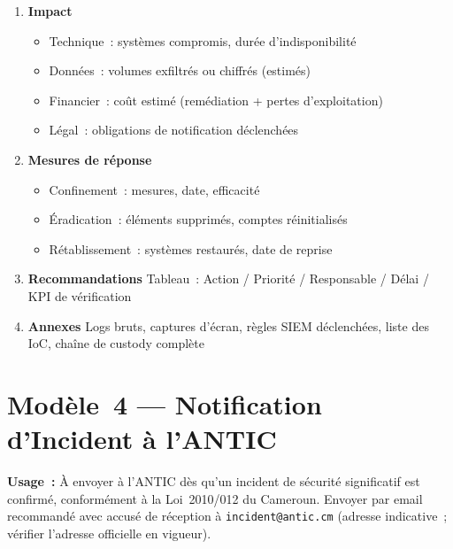 \begin{enumerate}
  \item \textbf{Impact}
        \begin{itemize}
          \item Technique~: systèmes compromis, durée d'indisponibilité
          \item Données~: volumes exfiltrés ou chiffrés (estimés)
          \item Financier~: coût estimé (remédiation + pertes d'exploitation)
          \item Légal~: obligations de notification déclenchées
        \end{itemize}

  \item \textbf{Mesures de réponse}
        \begin{itemize}
          \item Confinement~: mesures, date, efficacité
          \item Éradication~: éléments supprimés, comptes réinitialisés
          \item Rétablissement~: systèmes restaurés, date de reprise
        \end{itemize}

  \item \textbf{Recommandations}
        Tableau~: Action / Priorité / Responsable / Délai / KPI de vérification

  \item \textbf{Annexes}
        Logs bruts, captures d'écran, règles SIEM déclenchées,
        liste des IoC, chaîne de custody complète
\end{enumerate}

\clearpage

\section{Modèle~4 — Notification d'Incident à l'ANTIC}
\label{ann:tpl-antic}

\begin{boxinfo}
\textbf{Usage~:} À envoyer à l'ANTIC dès qu'un incident de sécurité
significatif est confirmé, conformément à la Loi~2010/012 du Cameroun.
Envoyer par email recommandé avec accusé de réception à
\texttt{incident@antic.cm} (adresse indicative~; vérifier l'adresse
officielle en vigueur).
\end{boxinfo}

